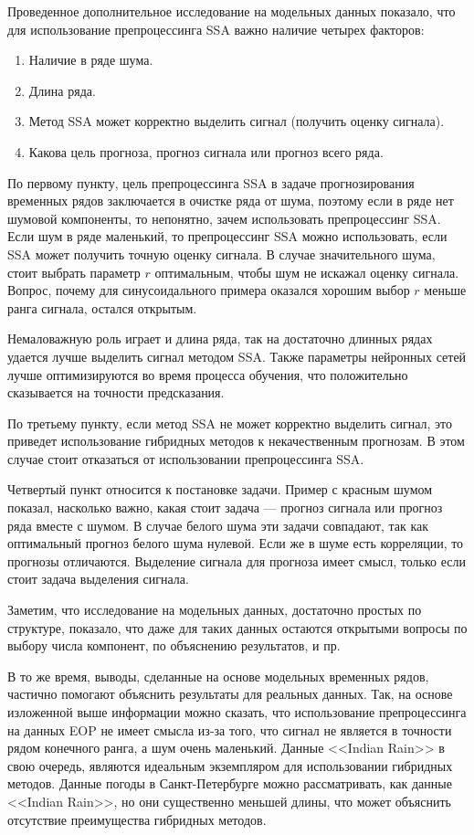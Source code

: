 \documentclass[specialist,
               substylefile = spbu.rtx,
               subf,href,colorlinks=true, 12p]{disser}
\begin{document}
Проведенное дополнительное исследование на модельных данных показало, что для использование препроцессинга SSA важно наличие четырех факторов:

\begin{enumerate}
	\item Наличие в ряде шума.
	\item Длина ряда.
	\item Метод SSA может корректно выделить сигнал (получить оценку сигнала).
    \item Какова цель прогноза, прогноз сигнала или прогноз всего ряда.
\end{enumerate}

По первому пункту, цель препроцессинга SSA в задаче прогнозирования временных рядов заключается в очистке ряда от шума, поэтому если в ряде нет шумовой компоненты, то непонятно, зачем использовать препроцессинг SSA. Если шум в ряде маленький, то препроцессинг SSA можно использовать, если SSA может получить точную оценку сигнала. В случае значительного шума, стоит выбрать параметр $r$ оптимальным, чтобы шум не искажал оценку сигнала. Вопрос, почему для синусоидального примера оказался хорошим выбор $r$ меньше ранга сигнала, остался открытым.

Немаловажную роль играет и длина ряда, так на достаточно длинных рядах удается лучше выделить сигнал методом SSA. Также параметры нейронных сетей лучше оптимизируются во время процесса обучения, что положительно сказывается на точности предсказания.

По третьему пункту, если метод SSA не может корректно выделить сигнал, это приведет использование гибридных методов к некачественным прогнозам. В этом случае стоит отказаться от использовании препроцессинга SSA.

Четвертый пункт относится к постановке задачи. Пример с красным шумом показал, насколько важно, какая стоит задача --- прогноз сигнала или прогноз ряда вместе с шумом. В случае белого шума эти задачи совпадают, так как оптимальный прогноз белого шума нулевой. Если же в шуме есть корреляции, то прогнозы отличаются. Выделение сигнала для прогноза имеет смысл, только если стоит задача выделения сигнала.

Заметим, что исследование на модельных данных, достаточно простых по структуре, показало, что даже для таких данных остаются открытыми вопросы по выбору числа компонент, по объяснению результатов, и пр.

В то же время, выводы, сделанные на основе модельных временных рядов, частично помогают объяснить результаты для реальных данных.
Так, на основе изложенной выше информации можно сказать, что использование препроцессинга на данных EOP не имеет смысла из-за того, что сигнал не является в точности рядом конечного ранга, а шум очень маленький. Данные <<Indian Rain>> в свою очередь, являются идеальным экземпляром для использовании гибридных методов. Данные погоды в Санкт-Петербурге можно рассматривать, как данные <<Indian Rain>>, но они существенно меньшей длины, что может объяснить отсутствие преимущества гибридных методов.
\end{document}
